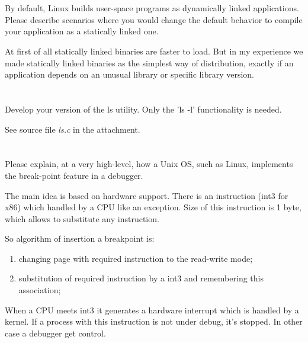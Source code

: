 \documentclass[a4paper,12pt]{article}
\begin{document}
\section{}
By default, Linux builds user-space programs as dynamically linked applications. Please describe scenarios where you would change the default behavior to compile your application as a statically linked one.

\noindent\makebox[\linewidth]{\rule{\textwidth}{0.4pt}}

At first of all statically linked binaries are faster to load. But in my experience we made statically linked binaries as the simplest way of distribution, exactly if an application depends on an unusual library or specific library version.

\section{}
Develop your version of the ls utility. Only the 'ls -l' functionality is needed.

\noindent\makebox[\linewidth]{\rule{\textwidth}{0.4pt}}

See source file \textit{ls.c} in the attachment.

\section{}
Please explain, at a very high-level, how a Unix OS, such as Linux, implements the break-point feature in a debugger.

\noindent\makebox[\linewidth]{\rule{\textwidth}{0.4pt}}

The main idea is based on hardware support.
There is an instruction (int3 for x86) which handled by a CPU like an exception. Size of this instruction is 1 byte, which allows to substitute any instruction.

So algorithm of insertion a breakpoint is:

\begin{enumerate}
	\item changing page with required instruction to the read-write mode;
	\item substitution of required instruction by a int3 and remembering this association;
\end{enumerate}

When a CPU meets int3 it generates a hardware interrupt which is handled by a kernel. If a process with this instruction is not under debug, it's stopped. In other case a debugger get control.
\end{document}
